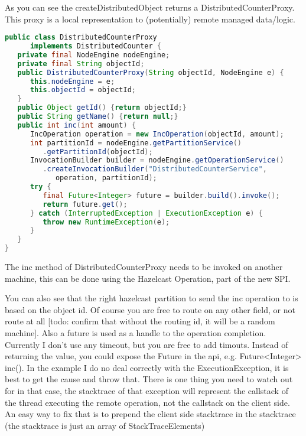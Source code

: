 As you can see the createDistributedObject returns a DistributedCounterProxy. This proxy is a local representation to (potentially) remote managed data/logic.  
\begin{lstlisting}[language=java]
public class DistributedCounterProxy 
      implements DistributedCounter {
   private final NodeEngine nodeEngine;
   private final String objectId;
   public DistributedCounterProxy(String objectId, NodeEngine e) {
      this.nodeEngine = e;
      this.objectId = objectId;
   }
   public Object getId() {return objectId;}
   public String getName() {return null;}
   public int inc(int amount) {
      IncOperation operation = new IncOperation(objectId, amount);
      int partitionId = nodeEngine.getPartitionService()
         .getPartitionId(objectId);
      InvocationBuilder builder = nodeEngine.getOperationService()
         .createInvocationBuilder("DistributedCounterService", 
            operation, partitionId);
      try {
         final Future<Integer> future = builder.build().invoke();
         return future.get();
      } catch (InterruptedException | ExecutionException e) {
         throw new RuntimeException(e);
      }
   }
}
\end{lstlisting}
The inc method of DistributedCounterProxy needs to be invoked on another machine, this can be done using the Hazelcast Operation, part of the new SPI. 

You can also see that the right hazelcast partition to send the inc operation to is based on the object id. Of course you are free to route on any other field, or not route at all [todo: confirm that without the routing id, it will be a random machine]. Also a future is used as a handle to the operation completion. Currently I don't use any timeout, but you are free to add timouts. Instead of returning the value, you could expose the Future in the api, e.g. Future<Integer> inc(). In the example I do no deal correctly with the ExecutionException, it is best to get the cause and throw that. There is one thing you need to watch out for in that case, the stacktrace of that exception will represent the callstack of the thread executing the remote operation, not the callstack on the client side. An easy way to fix that is to prepend  the client side stacktrace in the stacktrace (the stacktrace is just an array of StackTraceElements)

